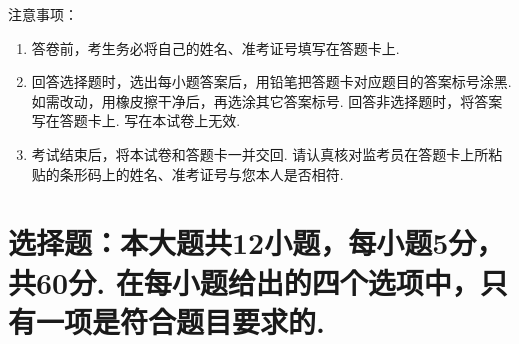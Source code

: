 \documentclass[12pt,space]{ctexart} %
\begin{document}
\juemi%
{\heiti 注意事项}：
\begin{enumerate}[itemsep=-0.3em,topsep=0pt]
\item 答卷前，考生务必将自己的姓名、准考证号填写在答题卡上. 
\item 回答选择题时，选出每小题答案后，用铅笔把答题卡对应题目的答案标号涂黑. 如需改动，用橡皮擦干净后，再选涂其它答案标号. 回答非选择题时，将答案写在答题卡上. 写在本试卷上无效. 
\item 考试结束后，将本试卷和答题卡一并交回. 请认真核对监考员在答题卡上所粘贴的条形码上的姓名、准考证号与您本人是否相符. 
\end{enumerate}

\section{选择题：本大题共12小题，每小题5分，共60分. 在每小题给出的四个选项中，只有一项是符合题目要求的. }
\begin{enumerate}[itemsep=0.2em,topsep=0pt]

\end{enumerate}

\clearpage
\end{document}

